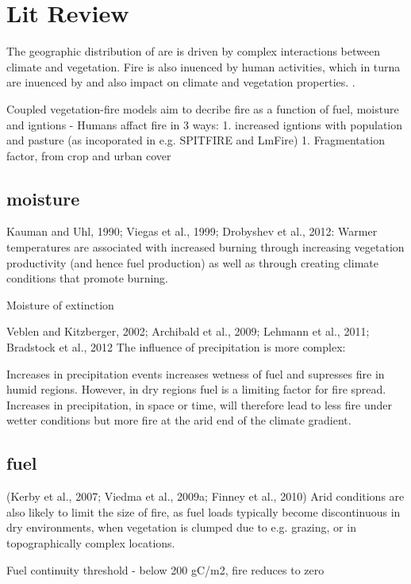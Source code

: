 \section{Lit Review}

The geographic distribution of are is driven by complex interactions between climate and vegetation.  Fire is also inuenced by human activities, which in turna are  inuenced  by  and  also  impact  on  climate  and  vegetation  properties.  \citep{hantson2016status, kelley2014modelling}.

\citep{hantson2016status}
Coupled vegetation-fire models aim to decribe fire as a function of fuel, moisture and igntions
- Humans affact fire in 3 ways:
	1. increased igntions with population and pasture (as incoporated in e.g. SPITFIRE and LmFire)
	1. Fragmentation factor, from crop and urban cover

\subsection{moisture}
Kauman and Uhl, 1990; Viegas et al., 1999; Drobyshev et al., 2012:
Warmer temperatures are associated with increased burning through increasing vegetation productivity (and hence fuel production) as well as through creating
climate conditions that promote burning.

Moisture of extinction

Veblen and Kitzberger, 2002; Archibald et al., 2009;  Lehmann  et  al.,  2011;  Bradstock  et  al.,  2012
The influence of precipitation is more complex:

Increases in precipitation events increases wetness of fuel and supresses fire in humid regions.
However, in dry regions fuel is a limiting factor for fire spread.  Increases in precipitation, in space or time, will therefore lead to less fire under wetter conditions but more fire at the arid end of the climate gradient.


\subsection{fuel}
(Kerby et al., 2007; Viedma et al., 2009a; Finney et al., 2010)
Arid  conditions  are  also  likely to limit the size of fire,  as fuel loads typically become discontinuous in dry environments, when vegetation is clumped due to e.g.  grazing, or in topographically complex locations.

\citep{thonicke2001role}
Fuel continuity threshold - below 200 gC/m2, fire reduces to zero

